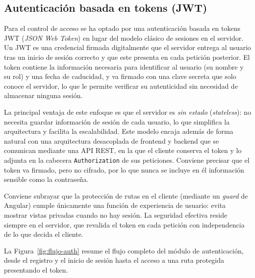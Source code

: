 \documentclass[12pt,a4paper,twoside,openright]{book}
\begin{document}
    \subsection{Autenticación basada en tokens (JWT)}

    Para el control de acceso se ha optado por una autenticación basada en
    tokens JWT (\textit{JSON Web Token}) en lugar del modelo clásico de sesiones
    en el servidor. Un JWT es una credencial firmada digitalmente que el
    servidor entrega al usuario tras un inicio de sesión correcto y que este
    presenta en cada petición posterior. El token contiene la información
    necesaria para identificar al usuario (su nombre y su rol) y una fecha de
    caducidad, y va firmado con una clave secreta que solo conoce el servidor,
    lo que le permite verificar su autenticidad sin necesidad de almacenar
    ninguna sesión.

    La principal ventaja de este enfoque es que el servidor es \textit{sin
    estado} (\textit{stateless}): no necesita guardar información de sesión de
    cada usuario, lo que simplifica la arquitectura y facilita la escalabilidad.
    Este modelo encaja además de forma natural con una arquitectura desacoplada
    de frontend y backend que se comunican mediante una API REST, en la que el
    cliente conserva el token y lo adjunta en la cabecera \texttt{Authorization}
    de sus peticiones. Conviene precisar que el token va firmado, pero no
    cifrado, por lo que nunca se incluye en él información sensible como la
    contraseña.

    Conviene subrayar que la protección de rutas en el cliente (mediante un
    \textit{guard} de Angular) cumple únicamente una función de experiencia de
    usuario: evita mostrar vistas privadas cuando no hay sesión. La seguridad
    efectiva reside siempre en el servidor, que revalida el token en cada
    petición con independencia de lo que decida el cliente.

    La Figura~\ref{fig:flujo-auth} resume el flujo completo del módulo de
    autenticación, desde el registro y el inicio de sesión hasta el acceso a una
    ruta protegida presentando el token.
\end{document}

